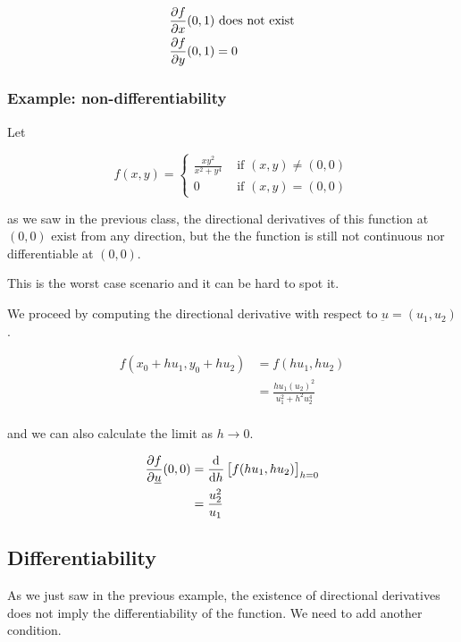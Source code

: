 \documentclass[10pt]{extarticle}
\renewcommand{\vec}[1]{\underbar{\ensuremath{#1}}}
\begin{document}
\begin{align*}
    \pdv{f}{x}()(0, 1) & \text{ does not exist} \\
    \pdv{f}{y}()(0, 1) & = 0
\end{align*}

\subsubsection{Example: non-differentiability}

Let

$$
    f(x, y) = \begin{cases}
        \frac{x y^2}{x^2 + y^4} & \text{ if } (x, y) \neq (0, 0) \\
        0                       & \text{ if } (x, y) = (0, 0)
    \end{cases}
$$

as we saw in the previous class, the directional derivatives of this function at $(0, 0)$ exist from any direction, but the the function is still not continuous nor differentiable at $(0, 0)$.

This is the worst case scenario and it can be hard to spot it.

We proceed by computing the directional derivative with respect to $\vec{u} = (u_1, u_2)$.

\begin{align*}
    f(x_0 + hu_1, y_0 + hu_2) & = f(hu_1, hu_2)                         \\
                              & = \frac{hu_1(u_2)^2}{u_1^2 + h^2 u_2^4} \\
\end{align*}

and we can also calculate the limit as $h \to 0$.

\begin{align*}
    \pdv{f}{\vec{u}}()(0, 0) & = \dv{h} \left[ f(hu_1, hu_2) \right]_{h = 0} \\
                             & = \frac{u_2^2}{u_1}                           \\
\end{align*}

\subsection{Differentiability}

As we just saw in the previous example, the existence of directional derivatives does not imply the differentiability of the function.
We need to add another condition.
\end{document}
